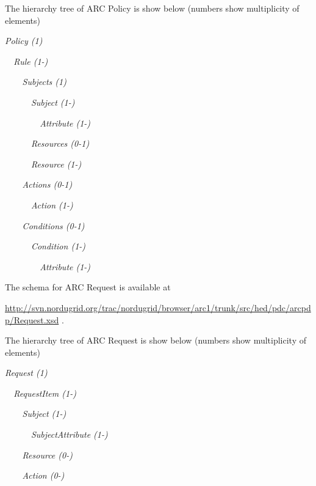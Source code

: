 \documentclass[a4paper]{article}
\begin{document}
{\color{black}
The hierarchy tree of ARC Policy is show below (numbers show
multiplicity of elements)}

{\itshape\color{black}
Policy (1)}

{\itshape\color{black}
\ \ Rule (1-)}

{\itshape\color{black}
\ \ \ \ Subjects (1)}

{\itshape\color{black}
\ \ \ \ \ \ Subject (1-)}

{\itshape\color{black}
\ \ \ \ \ \ \ \ Attribute (1-)}

{\itshape\color{black}
\ \ \ \ \ \ Resources (0-1)}

{\itshape\color{black}
\ \ \ \ \ \ Resource (1-)}

{\itshape\color{black}
\ \ \ \ Actions (0-1)}

{\itshape\color{black}
\ \ \ \ \ \ Action (1-)}

{\itshape\color{black}
\ \ \ \ Conditions (0-1)}

{\itshape\color{black}
\ \ \ \ \ \ Condition (1-)}

{\itshape\color{black}
\ \ \ \ \ \ \ \ Attribute (1-)}

{\upshape\color{black}
The schema for ARC Request is available at \ }

{\upshape\color{black}
\url{http://svn.nordugrid.org/trac/nordugrid/browser/arc1/trunk/src/hed/pdc/arcpdp/Request.xsd}
.}

{\upshape\color{black}
The hierarchy tree of ARC Request is show below (numbers show
multiplicity of elements)}

{\itshape\color{black}
Request (1)}

{\itshape\color{black}
\ \ RequestItem (1-)}

{\itshape\color{black}
\ \ \ \ Subject (1-)}

{\itshape\color{black}
\ \ \ \ \ \ SubjectAttribute (1-)}

{\itshape\color{black}
\ \ \ \ Resource (0-)}

{\itshape\color{black}
\ \ \ \ Action (0-)}
\end{document}
